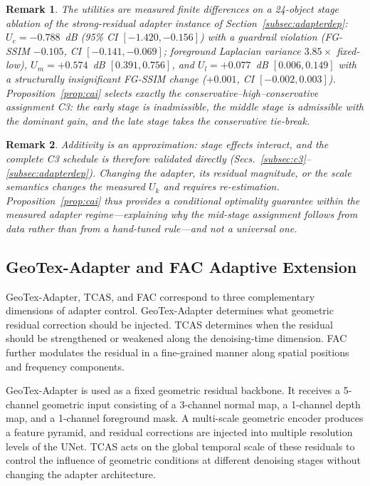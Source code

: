 \documentclass[times,twocolumn,final]{elsarticle}
\newtheorem{remark}{Remark} %
\providecommand{\DIFadd}[1]{{\protect\color{red} \sf #1}} %
\providecommand{\DIFaddend}{} %
\DeclareRobustCommand{\DIFaddend}{\DIFOaddend \let\includegraphics\DIFOincludegraphics} %
\begin{document}
\begin{remark}
\DIFadd{The utilities are measured finite differences on a 24-object stage ablation of the strong-residual adapter instance of Section~\ref{subsec:adapterdep}: $U_e=-0.788$~dB (95\% CI $[-1.420,-0.156]$) with a guardrail violation (FG-SSIM $-0.105$, CI $[-0.141,-0.069]$; foreground Laplacian variance $3.85\times$ fixed-low), $U_m=+0.574$~dB $[0.391,0.756]$, and $U_l=+0.077$~dB $[0.006,0.149]$ with a structurally insignificant FG-SSIM change ($+0.001$, CI $[-0.002,0.003]$). Proposition~\ref{prop:cai} selects exactly the conservative--high--conservative assignment C3: the early stage is inadmissible, the middle stage is admissible with the dominant gain, and the late stage takes the conservative tie-break.
}\end{remark}

\begin{remark}
\DIFadd{Additivity is an approximation: stage effects interact, and the complete C3 schedule is therefore validated directly (Secs.~\ref{subsec:c3}--\ref{subsec:adapterdep}). Changing the adapter, its residual magnitude, or the scale semantics changes the measured $U_k$ and requires re-estimation. Proposition~\ref{prop:cai} thus provides a conditional optimality guarantee within the measured adapter regime---explaining why the mid-stage assignment follows from data rather than from a hand-tuned rule---and not a universal one.
}\end{remark}

\DIFaddend \subsection{GeoTex-Adapter and FAC Adaptive Extension}
\label{subsec:fac}

GeoTex-Adapter, TCAS, and FAC correspond to three complementary dimensions of adapter control. GeoTex-Adapter determines what geometric residual correction should be injected. TCAS determines when the residual should be strengthened or weakened along the denoising-time dimension. FAC further modulates the residual in a fine-grained manner along spatial positions and frequency components.

GeoTex-Adapter is used as a fixed geometric residual backbone. It receives a 5-channel geometric input consisting of a 3-channel normal map, a 1-channel depth map, and a 1-channel foreground mask. A multi-scale geometric encoder produces a feature pyramid, and residual corrections are injected into multiple resolution levels of the UNet. TCAS acts on the global temporal scale of these residuals to control the influence of geometric conditions at different denoising stages without changing the adapter architecture.
\end{document}
